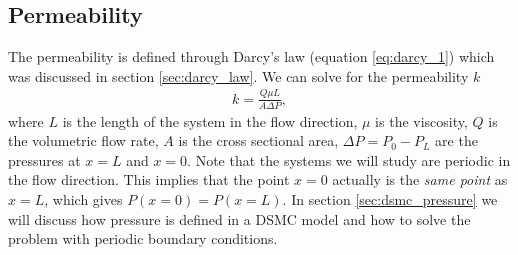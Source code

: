 \subsection{Permeability}
\label{sec:permeability_dsmc}
The permeability is defined through Darcy's law (equation \eqref{eq:darcy_1}) which was discussed in section \ref{sec:darcy_law}. We can solve for the permeability $k$
\begin{align}
	\label{eq:permeability_gas}
	k = \frac{Q \mu L}{A\Delta P},
\end{align}
where $L$ is the length of the system in the flow direction, $\mu$ is the viscosity, $Q$ is the volumetric flow rate, $A$ is the cross sectional area, $\Delta P = P_0 - P_L$ are the pressures at $x=L$ and $x=0$. Note that the systems we will study are periodic in the flow direction. This implies that the point $x=0$ actually is the \textit{same point} as $x=L$, which gives $P(x=0) = P(x=L)$. In section \ref{sec:dsmc_pressure} we will discuss how pressure is defined in a DSMC model and how to solve the problem with periodic boundary conditions.